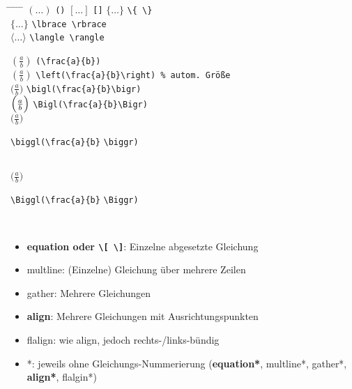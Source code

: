 \begin{tabbing}
\hspace{2.5em} \=  \hspace{3em} 
\= \hspace{2.5em} \= \hspace{3em}
\= \hspace{2.5em} \= \hspace{3em} \kill
$( \dots)$								\> \lstinline|()|	\>
$[ \dots]$								\> \lstinline|[]|	\>
$\{ \dots\}$							\> \lstinline|\{ \}	|	\\
$\lbrace \dots\rbrace$		\> \lstinline|\lbrace \rbrace|	\\
$\langle \dots\rangle$		\> \lstinline|\langle \rangle|	
\end{tabbing}
%
\begin{tabbing}
$(\frac{a}{b})$ \hspace{1ex}  \= \lstinline|(\frac{a}{b})|  \\

$\left(\frac{a}{b}\right)$  
	\> \lstinline|\left(\frac{a}{b}\right) % autom. Größe|  \\
	
$\bigl(\frac{a}{b}\bigr)$  
	\> \lstinline|\bigl(\frac{a}{b}\bigr)|  \\
	
$\Bigl(\frac{a}{b}\Bigr)$  
	\> \lstinline|\Bigl(\frac{a}{b}\Bigr)|  \\
	
$\biggl(\frac{a}{b}\biggr)$  
	\>	\begin{minipage}{0.6\linewidth}
				\lstinline|\biggl(\frac{a}{b}| 
				\lstinline|\biggr)|
			\end{minipage} \\
	
$\Biggl(\frac{a}{b}\Biggr)$  
	\> \begin{minipage}{0.6\linewidth}
				\lstinline|\Biggl(\frac{a}{b}|
				\lstinline|\Biggr)|  
			\end{minipage} \\
	
\end{tabbing}

\negAbstand
{}

\addtolength{\leftmargini}{-15pt}
\begin{itemize}
	\item {\bfseries equation oder \lstinline|\[ \]|}: Einzelne abgesetzte Gleichung
	\item multline: (Einzelne) Gleichung über mehrere Zeilen
	\item gather: 	Mehrere Gleichungen
	\item {\bfseries align}: 		Mehrere Gleichungen mit Ausrichtungspunkten
	\item flalign: 	wie align, jedoch rechts-/links-bündig
	\item *: jeweils ohne Gleichungs-Nummerierung (\mbox{\bfseries equation*}, 
	multline*, 
	gather*, 
	{\bfseries align*}, 
	flalgin*)
\end{itemize}
\addtolength{\leftmargini}{15pt}

